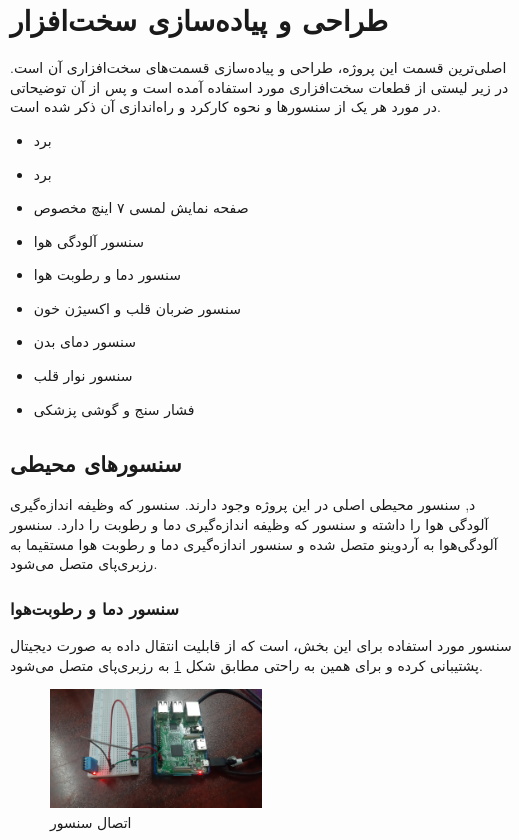 \section{طراحی و پیاده‌سازی سخت‌افزار}

اصلی‌ترین قسمت این پروژه، طراحی و پیاده‌سازی قسمت‌های سخت‌افزاری آن است. در زیر لیستی از قطعات سخت‌افزاری مورد استفاده آمده است و پس‌ از آن توضیحاتی در مورد هر یک از سنسور‌ها و نحوه کارکرد و راه‌اندازی آن ذکر شده است.


\begin{itemize}
	\item برد 
	\item برد 
	\item صفحه نمایش لمسی ۷ اینچ مخصوص 
	\item سنسور آلودگی هوا 
	\item سنسور دما و رطوبت هوا 
	\item سنسور ضربان قلب و اکسیژن‌ خون 
	\item سنسور دمای بدن 
	\item سنسور نوار قلب 
	\item فشار سنج و گوشی پزشکی
\end{itemize}


\subsection{سنسورهای محیطی}

د, سنسور محیطی اصلی در این پروژه وجود دارند. سنسور  که وظیفه اندازه‌گیری آلودگی هوا را داشته و سنسور  که وظیفه اندازه‌گیری دما و رطوبت را دارد. سنسور آلودگی‌هوا به آردوینو متصل شده و سنسور اندازه‌گیری دما و رطوبت هوا مستقیما به رزبری‌پای متصل می‌شود.


\subsubsection{سنسور دما و رطوبت‌هوا}

سنسور مورد استفاده برای این بخش،  است که از قابلیت انتقال داده به صورت دیجیتال پشتیبانی کرده و برای همین به راحتی مطابق شکل \ref{fig:2} به رزبری‌پای متصل می‌شود.

\begin{figure}[h]
	\centering
	\includegraphics[width=0.5\textwidth]{figs/dht11.jpg}
	
	\caption{اتصال سنسور }
	\label{fig:2}
\end{figure}


